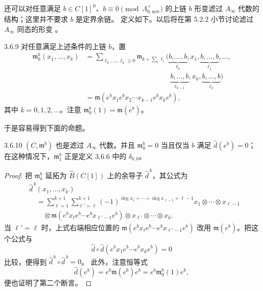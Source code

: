 还可以对任意满足
$b\in C[1]^0$、$b\equiv0\pmod{\Lambda^+_{0,\mathrm{nov}}}$
的上链 $b$ 形变滤过 $A_\infty$ 代数的结构；这里并不要求 $b$ 是定界余链。
定义如下。以后将在第 5.2.2 小节讨论滤过 $A_\infty$ 同态的形变
。

\begin{definition}{3.6.9}\label{def:3-6-9}
对任意满足上述条件的上链 $b$，置
\[
\begin{aligned}
  \mathfrak m_k^b(x_1,\ldots,x_k)
  &={}
  \sum_{\ell_0,\ldots,\ell_k\geq0}
  \mathfrak m_{k+\sum_i\ell_i}
  \bigl(
    \underbrace{b,\ldots,b}_{\ell_0},x_1,
    \underbrace{b,\ldots,b}_{\ell_1},\ldots,\\[-0.2em]
  &\hspace{12em}
    \underbrace{b,\ldots,b}_{\ell_{k-1}},x_k,
    \underbrace{b,\ldots,b}_{\ell_k}
  \bigr)\\
  &={}
  \mathfrak m(e^b x_1e^b x_2\cdots x_{k-1}e^b x_ke^b),
\end{aligned}
\]
其中 $k=0,1,2,\ldots$。注意
$\mathfrak m_0^b(1)=\mathfrak m(e^b)$。
\end{definition}

于是容易得到下面的命题。

\begin{proposition}{3.6.10}\label{prop:3-6-10}
$(C,\mathfrak m^b)$ 也是滤过 $A_\infty$ 代数。并且
$\mathfrak m_0^b=0$ 当且仅当 $b$ 满足 $\widehat d(e^b)=0$；
在这种情况下，$\mathfrak m_1^b$ 正是定义 3.6.6 中的
$\delta_{b,b}$。
\end{proposition}

\begin{proof}
把 $\mathfrak m_k^b$ 延拓为 $\widehat B(C[1])$ 上的余导子
$\widehat d^{\,b}$，其公式为
\[
\begin{aligned}
&\widehat d^{\,b}(x_1,\ldots,x_k)\\
&\quad={}
\sum_{\ell=1}^{k+1}\sum_{\ell'=\ell}^{k+1}
(-1)^{\deg x_1+\cdots+\deg x_{\ell-1}+\ell-1}
x_1\otimes\cdots\otimes x_{\ell-1}\\
&\qquad{}\otimes
\mathfrak m(e^b x_\ell e^b\cdots e^b x_{\ell'-1}e^b)
\otimes x_{\ell'}\otimes\cdots\otimes x_k.
\end{aligned}
\]
当 $\ell'=\ell$ 时，上式右端相应位置的
$\mathfrak m(e^b x_\ell e^b\cdots e^b x_{\ell'-1}e^b)$
改用 $\mathfrak m(e^b)$。把这个公式与
\[
  \widehat d\circ\widehat d
  (e^b x_1e^b\cdots e^b x_ke^b)=0
\]
比较，便得到 $\widehat d^{\,b}\circ\widehat d^{\,b}=0$。
此外，注意恒等式
\[
  \widehat d(e^b)
  =e^b\mathfrak m(e^b)e^b
  =e^b\mathfrak m_0^b(1)e^b,
\]
便也证明了第二个断言。
\end{proof}


